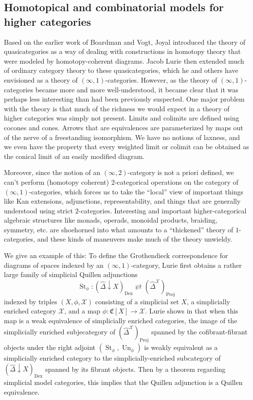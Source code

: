 \documentclass[a4paper,9pt]{amsart}
\theoremstyle{plain}   %
\theoremstyle{remark}
\theoremstyle{plain}
\newcommand{\psh}[1]{\ensuremath{\widehat{#1}}}
\begin{document}
\subsection{Homotopical and combinatorial models for higher categories}
Based on the earlier work of Boardman and Vogt, Joyal introduced the theory of quasicategories as a way of dealing with constructions in homotopy theory that were modeled by homotopy-coherent diagrams.  Jacob Lurie then extended much of ordinary category theory to these quasicategories, which he and others have envisioned as a theory of \((\infty,1)\)-categories. However, as the theory of \((\infty,1)\)-categories became more and more well-understood, it became clear that it was perhaps less interesting than had been previously suspected. One major problem with the theory is that much of the richness we would expect in a theory of higher categories was simply not present. Limits and colimits are defined using cocones and cones.  Arrows that are equivalences are parameterized by maps out of the nerve of a freestanding isomorphism.  We have no notions of laxness, and we even have the property that every weighted limit or colimit can be obtained as the conical limit of an easily modified diagram.   

Moreover, since the notion of an \((\infty,2)\)-category is not a priori defined, we can't perform (homotopy coherent) 2-categorical operations on the category of \((\infty,1)\)-categories, which forces us to take the ``local'' view  of important things like Kan extensions, adjunctions, representability, and things that are generally understood using strict \(2\)-categories.  Interesting and important higher-categorical algebraic structures like monads, operads, monoidal products, braiding, symmetry, etc. are shoehorned into what amounts to a ``thickened'' theory of \(1\)-categories, and these kinds of maneuvers make much of the theory unwieldy. 

We give an example of this: To define the Grothendieck correspondence for diagrams of spaces indexed by an \((\infty,1)\)-category, Lurie first obtains a rather large family of simplicial Quillen adjunctions \[\operatorname{St}_\phi:(\psh{\Delta}\downarrow X)_{\operatorname{Dex}} \rightleftarrows  (\psh{\Delta}^{\mathcal{X}})_{\operatorname{Proj}}\] indexed by triples \((X, \phi, \mathcal{X})\) consisting of a simplicial set \(X\), a simplicially enriched category \(\mathcal{X}\), and a map \(\phi:\mathfrak{C}[X]\to \mathcal{X}\).  Lurie shows in \cite{htt} that when this map is a weak equivalence of simplicially enriched categories, the image of the simplicially enriched subjecategory of \((\psh{\Delta}^{\mathcal{X}})_{\operatorname{Proj}}\) spanned by the cofibrant-fibrant objects under the right adjoint \((\operatorname{St}_\phi,\operatorname{Un}_\phi)\) is weakly equivalent as a simplicially enriched category to the simplicially-enriched subcategory of  \((\psh{\Delta}\downarrow X)_{\operatorname{Dex}} \) spanned by its fibrant objects.  Then by a theorem regarding simplicial model categories, this implies that the Quillen adjunction is a Quillen equivalence.  
\end{document}
